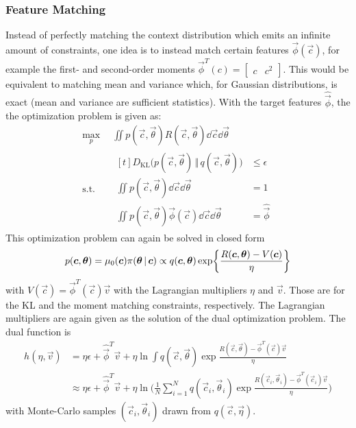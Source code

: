			\subsubsection{Feature Matching}
				Instead of perfectly matching the context distribution which emits an infinite amount of constraints, one idea is to instead match certain features \( \vec{\phi}(\vec{c}) \), for example the first- and second-order moments \( \vec{\phi}^T(c) = \begin{bmatrix} c & c^2 \end{bmatrix} \). This would be equivalent to matching mean and variance which, for Gaussian distributions, is exact (mean and variance are sufficient statistics). With the target features \( \hat{\vec{\phi}} \), the the optimization problem is given as:
				\begin{equation*}
					\begin{aligned}
						\max_p \,& \iint\! p(\vec{c}, \vec{\theta}) R(\vec{c}, \vec{\theta}) \dd{\vec{c}} \dd{\vec{\theta}} \\
						\mathrm{s.t.} \quad&
							\begin{aligned}[t]
								D_\mathrm{KL}\big( p(\vec{c}, \vec{\theta}) \,\Vert\, q(\vec{c}, \vec{\theta}) \big) &\leq \epsilon \\
								\iint\! p(\vec{c}, \vec{\theta}) \dd{\vec{c}} \dd{\vec{\theta}} &= 1 \\
								\iint\! p(\vec{c}, \vec{\theta}) \vec{\phi}(\vec{c}) \dd{\vec{c}} \dd{\vec{\theta}} &= \hat{\vec{\phi}}
							\end{aligned}
					\end{aligned}
				\end{equation*}
				This optimization problem can again be solved in closed form
				\begin{equation*}
					p(\bm{c}, \bm{\theta})
						= \mu_0(\bm{c}) \pi(\bm{\theta} \,\vert\, \bm{c})
						\propto q(\bm{c}, \bm{\theta}) \exp{ \frac{R(\bm{c}, \bm{\theta}) - V(\bm{c})}{\eta} }
				\end{equation*}
				with \( V(\vec{c}) = \vec{\phi}^T(\vec{c}) \vec{v} \) with the Lagrangian multipliers \(\eta\) and \(\vec{v}\). Those are for the KL and the moment matching constraints, respectively. The Lagrangian multipliers are again given as the solution of the dual optimization problem. The dual function is
				\begin{align*}
					h(\eta, \vec{v})
						&= \eta\epsilon + \hat{\vec{\phi}}^T \vec{v} + \eta \ln \int\! q(\vec{c}, \vec{\theta}) \exp{ \frac{R(\vec{c}, \vec{\theta}) - \vec{\phi}^T(\vec{c}) \vec{v}}{\eta} } \\
						&\approx \eta\epsilon + \hat{\vec{\phi}}^T \vec{v} + \eta \ln \Bigg(\! \frac{1}{N} \sum_{i = 1}^{N} q(\vec{c}_i, \vec{\theta}_i) \exp{ \frac{R(\vec{c}_i, \vec{\theta}_i) - \vec{\phi}^T(\vec{c}_i) \vec{v}}{\eta} } \!\Bigg)
				\end{align*}
				with Monte-Carlo samples \( (\vec{c}_i, \vec{\theta}_i) \) drawn from \( q(\vec{c}, \vec{\eta}) \).

